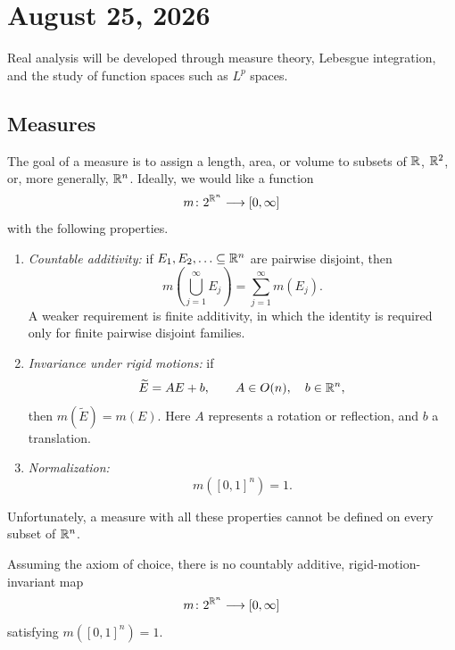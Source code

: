 \section{August 25, 2026}

Real analysis will be developed through measure theory, Lebesgue
integration, and the study of function spaces such as $L^p$ spaces.

\subsection{Measures}

The goal of a measure is to assign a length, area, or volume to subsets of
$\mathbb{R}$, $\mathbb{R}^2$, or, more generally, $\mathbb{R}^n$. Ideally, we would like
a function
\[
  m\colon 2^{\mathbb{R}^n}\longrightarrow [0,\infty]
\]
with the following properties.
\begin{enumerate}[label=(\roman*)]
  \item \emph{Countable additivity:} if $E_1,E_2,\ldots\subseteq\mathbb{R}^n$
    are pairwise disjoint, then
    \[
      m\left(\bigcup_{j=1}^{\infty}E_j\right)
      =\sum_{j=1}^{\infty}m(E_j).
    \]
    A weaker requirement is finite additivity, in which the identity is
    required only for finite pairwise disjoint families.
  \item \emph{Invariance under rigid motions:} if
    \[
      \widetilde E=AE+b,
      \qquad A\in O(n),\quad b\in\mathbb{R}^n,
    \]
    then $m(\widetilde E)=m(E)$. Here $A$ represents a rotation or
    reflection, and $b$ a translation.
  \item \emph{Normalization:}
    \[
      m([0,1]^n)=1.
    \]
\end{enumerate}

Unfortunately, a measure with all these properties cannot be defined on
every subset of $\mathbb{R}^n$.

\begin{theorem}[Vitali]
  Assuming the axiom of choice, there is no countably additive,
  rigid-motion-invariant map
  \[
    m\colon 2^{\mathbb{R}^n}\longrightarrow[0,\infty]
  \]
  satisfying $m([0,1]^n)=1$.
\end{theorem}

